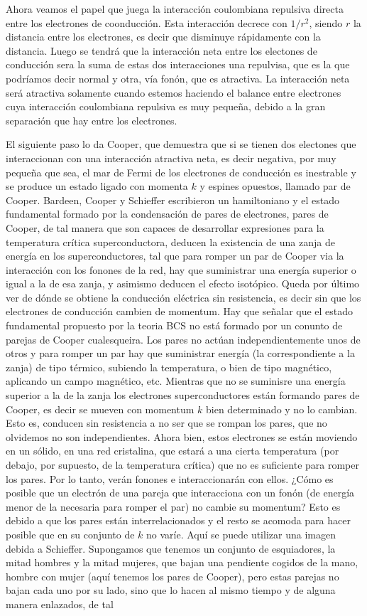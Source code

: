 Ahora veamos el papel que juega la interacción coulombiana repulsiva directa entre los electrones de coonducción. Esta interacción decrece con $1/r^2$, siendo $r$ la distancia entre los electrones, es decir que disminuye rápidamente con la distancia. Luego se tendrá que la interacción neta entre los electones de conducción sera la suma de estas dos interacciones una repulvisa, que es la que podríamos decir normal y otra, vía fonón, que es atractiva. La interacción neta será atractiva solamente cuando estemos haciendo el balance entre electrones cuya interacción coulombiana repulsiva es muy pequeña, debido a la gran separación que hay entre los electrones.

\color{red}El siguiente paso lo da Cooper, que demuestra que si se tienen dos electones que interaccionan con una interacción atractiva neta, es decir negativa, por muy pequeña que sea, el mar de Fermi de los electrones de conducción es inestrable y se produce un estado ligado con momenta $k$ y espines opuestos, llamado par de Cooper. Bardeen, Cooper y Schieffer escribieron un hamiltoniano y el estado fundamental formado por la condensación de pares de electrones, pares de Cooper, de tal manera que son capaces de desarrollar expresiones para la temperatura crítica superconductora, deducen la existencia de una zanja de energía en los superconductores, tal que para romper un par de Cooper via la interacción con los fonones de la red, hay que suministrar una energía superior o igual a la de esa zanja, y asimismo deducen el efecto isotópico. Queda por último ver de dónde se obtiene la conducción eléctrica sin resistencia, es decir sin que los electrones de conducción cambien de momentum. Hay que señalar que el estado fundamental propuesto por la teoria BCS no está formado por un conunto de parejas de Cooper cualesqueira. Los pares no actúan independientemente unos de otros y para romper un par hay que suministrar energía (la correspondiente a la zanja) de tipo térmico, subiendo la temperatura, o bien de tipo magnético, aplicando un campo magnético, etc. Mientras que no se suminisre una energía superior a la de la zanja los electrones superconductores están formando pares de Cooper, es decir se mueven con momentum $k$ bien determinado y no lo cambian. Esto es, conducen sin resistencia a no ser que se rompan los pares, que no olvidemos no son independientes. Ahora bien, estos electrones se están moviendo en un sólido, en una red cristalina, que estará a una cierta temperatura (por debajo, por supuesto, de la temperatura crítica) que no es suficiente para romper los pares. Por lo tanto, verán fonones e interaccionarán con ellos. ¿Cómo es posible que un electrón de una pareja que interacciona con un fonón (de energía menor de la necesaria para romper el par) no cambie su momentum? Esto es debido a que los pares están interrelacionados y el resto se acomoda para hacer posible que en su conjunto de $k$ no varíe. Aquí se puede utilizar una imagen debida a Schieffer. Supongamos que tenemos un conjunto de esquiadores, la mitad hombres y la mitad mujeres, que bajan una pendiente cogidos de la mano, hombre con mujer (aquí tenemos los pares de Cooper), pero estas parejas no bajan cada uno por su lado, sino que lo hacen al mismo tiempo y de alguna manera enlazados, de tal 